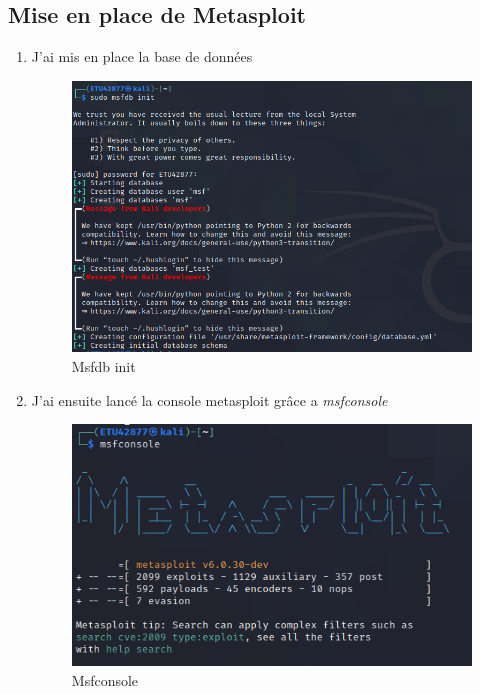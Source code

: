 \documentclass[a4paper]{article}
\begin{document}
\subsection{Mise en place de Metasploit}
\begin{enumerate}
  \item J'ai mis en place la base de données
  \begin{figure}[H]
    \centering
    \includegraphics[width=14cm]{images/Rapport/kali/1.png}
    \caption{Msfdb init}
  \end{figure}
  \item J'ai ensuite lancé la console metasploit grâce a \emph{msfconsole}
  \begin{figure}[H]
    \centering
    \includegraphics[width=14cm]{images/Rapport/kali/2.png}
    \caption{Msfconsole}
  \end{figure}
\end{enumerate}
\end{document}
